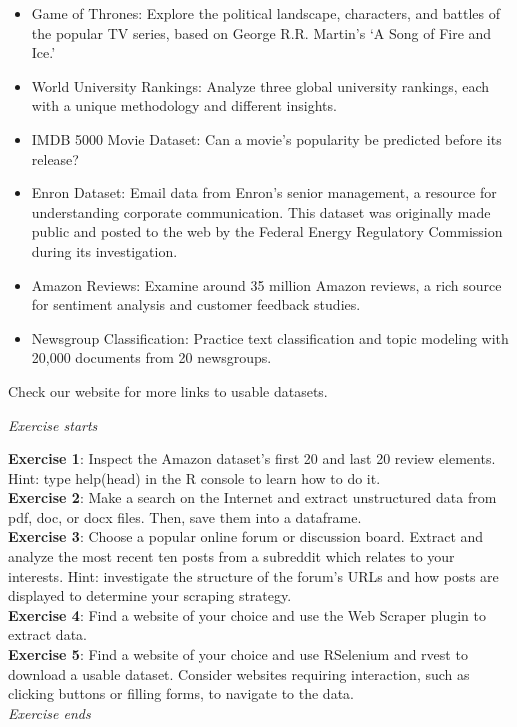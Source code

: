 \begin{itemize}
\tightlist
\item
  Game of Thrones: Explore the political landscape, characters, and
  battles of the popular TV series, based on George R.R. Martin's `A
  Song of Fire and Ice.'\\
\item
  World University Rankings: Analyze three global university rankings,
  each with a unique methodology and different insights.\\
\item
  IMDB 5000 Movie Dataset: Can a movie's popularity be predicted before
  its release?\\
\item
  Enron Dataset: Email data from Enron's senior management, a resource
  for understanding corporate communication. This dataset was originally
  made public and posted to the web by the Federal Energy Regulatory
  Commission during its investigation.\\
\item
  Amazon Reviews: Examine around 35 million Amazon reviews, a rich
  source for sentiment analysis and customer feedback studies.\\
\item
  Newsgroup Classification: Practice text classification and topic
  modeling with 20,000 documents from 20 newsgroups.
\end{itemize}

Check our website for more links to usable datasets.

\emph{Exercise starts}

\textbf{Exercise 1}: Inspect the Amazon dataset's first 20 and last
20 review elements. Hint: type help(head) in the R console to learn how
to do it.\\
\textbf{Exercise 2}: Make a search on the Internet and extract
unstructured data from pdf, doc, or docx files. Then, save them into a
dataframe.\\
\textbf{Exercise 3}: Choose a popular online forum or discussion board.
Extract and analyze the most recent ten posts from a subreddit
which relates to your interests. Hint: investigate the structure of the forum's URLs
and how posts are displayed to determine your scraping strategy.\\
\textbf{Exercise 4}: Find a website of your choice and use the Web
Scraper plugin to extract data.\\
\textbf{Exercise 5}: Find a website of your choice and use RSelenium and
rvest to download a usable dataset. Consider websites requiring
interaction, such as clicking buttons or filling forms, to navigate to
the data.\\
\emph{Exercise ends}

